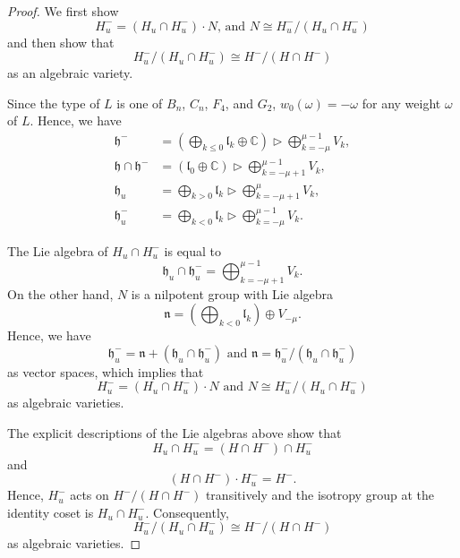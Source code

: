 \documentclass[10pt,a4paper]{amsart}
\newcommand{\C}{\mathbb{C}}
\newcommand{\h}{\mathfrak{h}}
\newcommand{\n}{\mathfrak{n}}
\begin{document}
\begin{proof}
We first show
\[H_u^- = (H_u \cap H_u^-) \cdot N \text{, and } N \cong H_u^- /(H_u \cap H_u^-)\]
and then show that
\[H_u^- /(H_u \cap H_u^-) \cong H^- /(H \cap H^-)\]
as an algebraic variety.

Since the type of $L$ is one of $B_n$, $C_n$, $F_4$, and $G_2$, $w_0(\omega) = -\omega$ for any weight $\omega$ of $L$. Hence, we have
\begin{align*}
\h^- &= (\bigoplus_{k\leq0} \mathfrak{l}_k \oplus \C) \rhd \bigoplus_{k = -\mu}^{\mu-1}V_k, \\
\h \cap \h^-  &= (\mathfrak{l}_0 \oplus \C) \rhd \bigoplus_{k = -\mu+1}^{\mu-1}V_k,\\
\h_u &= \bigoplus_{k > 0} \mathfrak{l}_k \rhd \bigoplus_{k = -\mu + 1}^{\mu}V_k,\\
\h_u^- &= \bigoplus_{k < 0} \mathfrak{l}_k \rhd \bigoplus_{k = -\mu}^{\mu-1}V_k.
\end{align*}

The Lie algebra of $H_u \cap H_u^-$ is equal to 
\[\h_u \cap \h_u^- = \bigoplus_{k=-\mu+1}^{\mu-1} V_{k}.\]
On the other hand, $N$ is a nilpotent group with Lie algebra
\[\n = (\bigoplus_{k < 0} \mathfrak{l}_k) \oplus V_{-\mu}.\]
Hence, we have 
\[\h_u^- = \n + (\h_u \cap \h_u^-) \text{ and } \n = \h_u^- / (\h_u \cap \h_u^-)\]
as vector spaces, which implies that
\[H_u^- = (H_u \cap H_u^-) \cdot N \text{ and } N\cong H_u^-/(H_u \cap H_u^-)\]
as algebraic varieties.

The explicit descriptions of the Lie algebras above show that
\[H_u \cap H_u^- = (H\cap H^-) \cap H_u^-\]
and 
\[(H \cap H^-) \cdot H_u^- = H^-.\]
Hence, $H_u^-$ acts on $H^-/(H \cap H^-)$ transitively and the isotropy group at the identity coset is $H_u \cap H_u^-$. Consequently, 
\[H_u^- /(H_u \cap H_u^-) \cong H^- /(H \cap H^-)\]
as algebraic varieties.
\end{proof}
\end{document}
